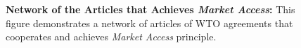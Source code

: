 \begin{figure}
    \centering{
      
    }
    \caption{{\bf Network of the Articles that Achieves \textit{Market Access}:} 
    This figure demonstrates a network of articles of WTO agreements
    that cooperates and achieves \textit{Market Access} principle.
    }
    \label{fig:market-aceess_directed}
  \end{figure}
  
% 

% 



